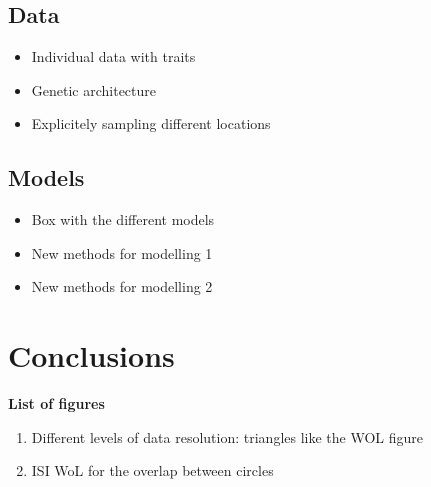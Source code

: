 \documentclass[11pt,oneside]{article}
\begin{document}
\subsection{Data}

\begin{itemize}
	\item Individual data with traits
	\item Genetic architecture
	\item Explicitely sampling different locations
\end{itemize}

\subsection{Models}

\begin{itemize}
	\item Box with the different models
	\item New methods for modelling 1
	\item New methods for modelling 2
\end{itemize}

\section{Conclusions}



\printbibliography

\cleardoublepage

\textbf{List of figures}
\begin{enumerate}
	\item Different levels of data resolution: triangles like the WOL figure
	\item ISI WoL for the overlap between circles
\end{enumerate}
\end{document}
